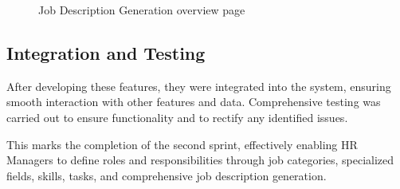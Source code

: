 \begin{figure}[H]
    \centering
    \caption{ Job Description Generation overview page}
    \label{fig:Job-Description-Generation-overview-page}
\end{figure}


\subsection{Integration and Testing}
After developing these features, they were integrated into the system, ensuring smooth interaction with other features and data. Comprehensive testing was carried out to ensure functionality and to rectify any identified issues.

This marks the completion of the second sprint, effectively enabling HR Managers to define roles and responsibilities through job categories, specialized fields, skills, tasks, and comprehensive job description generation.
